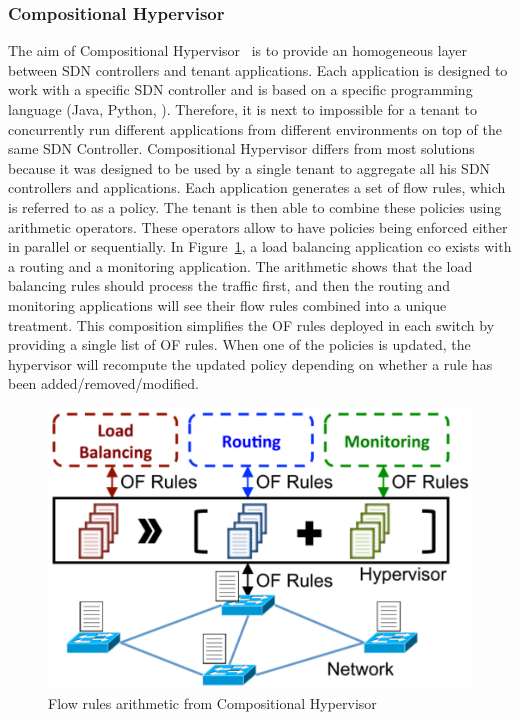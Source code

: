 \subsubsection{Compositional Hypervisor}
The aim of Compositional Hypervisor~\cite{CompositionalHypervisor-Jin2014} is to provide an homogeneous layer between SDN controllers and tenant applications.
Each application is designed to work with a specific SDN controller and is based on a specific programming language (Java, Python, \etc). Therefore, it is next to impossible for a tenant to concurrently run different applications from different environments on top of the same SDN Controller.
Compositional Hypervisor differs from most solutions because it was designed to be used by a single tenant to aggregate all his SDN controllers and applications.
Each application generates a set of flow rules, which is referred to as a policy.
The tenant is then able to combine these policies using arithmetic operators.
These operators allow to have policies being enforced either in parallel or sequentially. 
In Figure~\ref{fig:compositional-hyp}, a load balancing application co exists with a routing and a monitoring application. The arithmetic shows that the load balancing rules should process the traffic first, and then the routing and monitoring applications will see their flow rules combined into a unique treatment.
This composition simplifies the OF rules deployed in each switch by providing a single list of OF rules. When one of the policies is updated, the hypervisor will recompute the updated policy depending on whether a rule has been added/removed/modified.

\begin{figure}[ht]
    \centering
    \includegraphics[scale=0.7]{figures/compositional-structure.pdf}
    \caption{Flow rules arithmetic from Compositional Hypervisor~\cite{CompositionalHypervisor-Jin2014}}
    \label{fig:compositional-hyp}
\end{figure}


